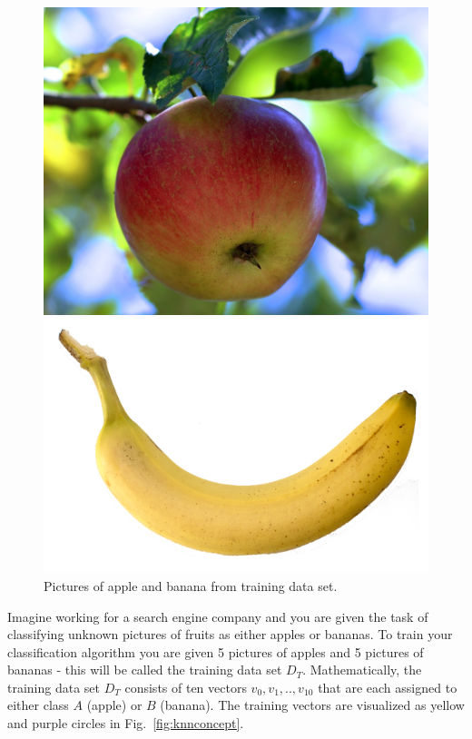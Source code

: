 \begin{figure}[ht]
  \begin{minipage}[t]{0.48\textwidth}
    \includegraphics[width = \textwidth]{img/apple.jpg}
  \end{minipage}
  \hfill
  \begin{minipage}[t]{0.48\textwidth}
    \includegraphics[width = \textwidth]{img/banana.png}
  \end{minipage}
  \caption{Pictures of apple and banana from training data set.}
  \label{img:appleandbanana}
\end{figure}

Imagine working for a search engine company and you are given the task of classifying unknown pictures of fruits as either apples or bananas. To train your classification algorithm you are given 5 pictures of apples and 5 pictures of bananas - this will be called the training data set ${D}_{T}$. Mathematically, the training data set ${D}_{T}$ consists of ten vectors ${v}_{0}, {v}_{1},..,{v}_{10}$ that are each assigned to either class $A$ (apple) or $B$ (banana). The training vectors are visualized as yellow and purple circles in Fig.~\ref{fig:knnconcept}.

